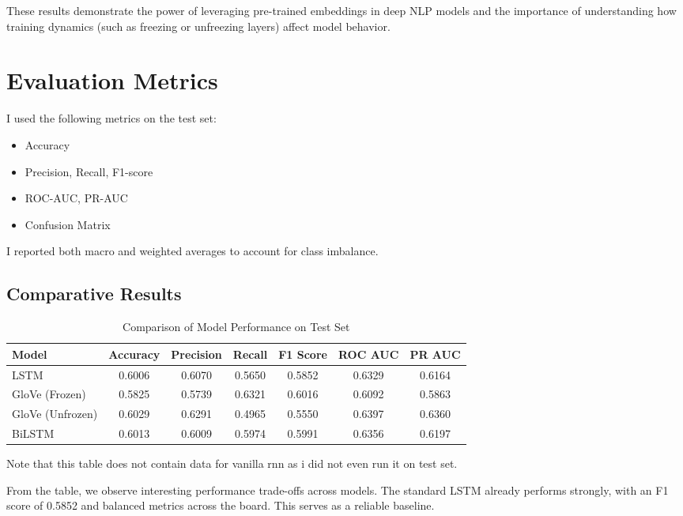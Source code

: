 \documentclass[12pt]{article}
\begin{document}
These results demonstrate the power of leveraging pre-trained embeddings in deep NLP models and the importance of understanding how training dynamics (such as freezing or unfreezing layers) affect model behavior.


\section{Evaluation Metrics}
I used the following metrics on the test set:

\begin{itemize}
    \item Accuracy
    \item Precision, Recall, F1-score
    \item ROC-AUC, PR-AUC
    \item Confusion Matrix
\end{itemize}

I reported both macro and weighted averages to account for class imbalance.

\subsection{Comparative Results}

\vspace{0.5em}
\begin{table}[H]
\centering
\caption{Comparison of Model Performance on Test Set}
\begin{tabular}{|l|c|c|c|c|c|c|}
\hline
\textbf{Model} & \textbf{Accuracy} & \textbf{Precision} & \textbf{Recall} & \textbf{F1 Score} & \textbf{ROC AUC} & \textbf{PR AUC} \\
\hline
LSTM & 0.6006 & 0.6070 & 0.5650 & 0.5852 & 0.6329 & 0.6164 \\
GloVe (Frozen) & 0.5825 & 0.5739 & 0.6321 & 0.6016 & 0.6092 & 0.5863 \\
GloVe (Unfrozen) & 0.6029 & 0.6291 & 0.4965 & 0.5550 & 0.6397 & 0.6360 \\
BiLSTM & 0.6013 & 0.6009 & 0.5974 & 0.5991 & 0.6356 & 0.6197 \\
\hline
\end{tabular}
\end{table}
Note that this table does not contain data for vanilla rnn as i did not even run it on test set.
\vspace{1em}


From the table, we observe interesting performance trade-offs across models. The standard LSTM already performs strongly, with an F1 score of 0.5852 and balanced metrics across the board. This serves as a reliable baseline.
\end{document}
